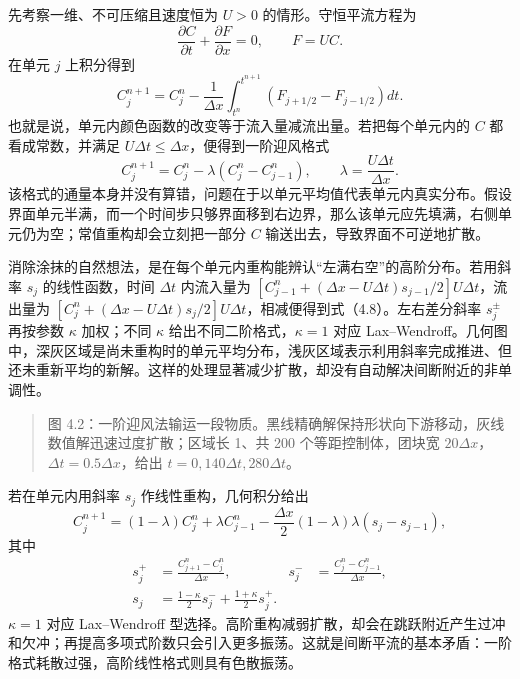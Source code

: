 \documentclass[11pt,a4paper,openany,fontset=none]{ctexbook}
\begin{document}
先考察一维、不可压缩且速度恒为 $U>0$ 的情形。守恒平流方程为
\begin{equation}
\frac{\partial C}{\partial t}+\frac{\partial F}{\partial x}=0,
\qquad F=UC.
\tag{4.5}
\end{equation}
在单元 $j$ 上积分得到
\begin{equation}
C_j^{n+1}=C_j^n-\frac{1}{\Delta x}
\int_{t^n}^{t^{n+1}}\left(F_{j+1/2}-F_{j-1/2}\right)dt.
\tag{4.6}
\end{equation}
也就是说，单元内颜色函数的改变等于流入量减流出量。若把每个单元内的 $C$ 都看成常数，并满足 $U\Delta t\leq\Delta x$，便得到一阶迎风格式
\begin{equation}
C_j^{n+1}=C_j^n-\lambda(C_j^n-C_{j-1}^n),
\qquad \lambda=\frac{U\Delta t}{\Delta x}.
\tag{4.7}
\end{equation}
该格式的通量本身并没有算错，问题在于以单元平均值代表单元内真实分布。假设界面单元半满，而一个时间步只够界面移到右边界，那么该单元应先填满，右侧单元仍为空；常值重构却会立刻把一部分 $C$ 输送出去，导致界面不可逆地扩散。

消除涂抹的自然想法，是在每个单元内重构能辨认“左满右空”的高阶分布。若用斜率 $s_j$ 的线性函数，时间 $\Delta t$ 内流入量为 $[C_{j-1}^n+(\Delta x-U\Delta t)s_{j-1}/2]U\Delta t$，流出量为 $[C_j^n+(\Delta x-U\Delta t)s_j/2]U\Delta t$，相减便得到式（4.8）。左右差分斜率 $s_j^\pm$ 再按参数 $\kappa$ 加权；不同 $\kappa$ 给出不同二阶格式，$\kappa=1$ 对应 Lax--Wendroff。几何图中，深灰区域是尚未重构时的单元平均分布，浅灰区域表示利用斜率完成推进、但还未重新平均的新解。这样的处理显著减少扩散，却没有自动解决间断附近的非单调性。

\begin{quote}\small 图 4.2：一阶迎风法输运一段物质。黑线精确解保持形状向下游移动，灰线数值解迅速过度扩散；区域长 1、共 200 个等距控制体，团块宽 $20\Delta x$，$\Delta t=0.5\Delta x$，给出 $t=0,140\Delta t,280\Delta t$。\end{quote}
若在单元内用斜率 $s_j$ 作线性重构，几何积分给出
\begin{equation}
C_j^{n+1}=(1-\lambda)C_j^n+\lambda C_{j-1}^n
-\frac{\Delta x}{2}(1-\lambda)\lambda(s_j-s_{j-1}),
\tag{4.8}
\end{equation}
其中
\begin{align}
s_j^+&=\frac{C_{j+1}^n-C_j^n}{\Delta x},&
s_j^-&=\frac{C_j^n-C_{j-1}^n}{\Delta x},\tag{4.9}\\
s_j&=\frac{1-\kappa}{2}s_j^-+\frac{1+\kappa}{2}s_j^+.
\tag{4.10}
\end{align}
$\kappa=1$ 对应 Lax--Wendroff 型选择。高阶重构减弱扩散，却会在跳跃附近产生过冲和欠冲；再提高多项式阶数只会引入更多振荡。这就是间断平流的基本矛盾：一阶格式耗散过强，高阶线性格式则具有色散振荡。
\end{document}
